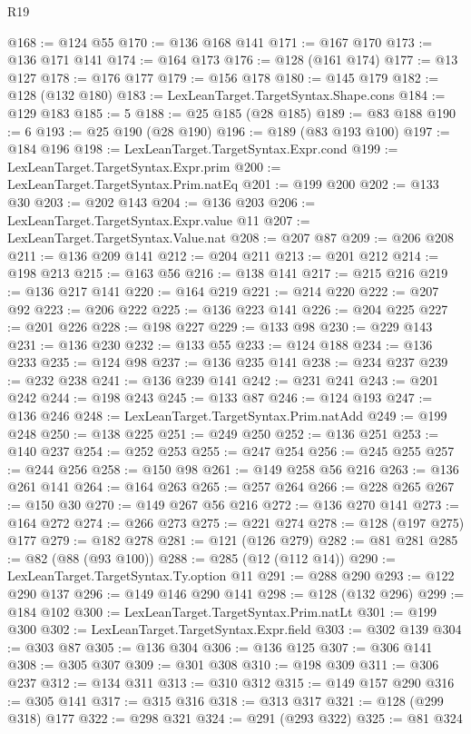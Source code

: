 \begin{lexlean}{R19}
\begin{coremodule}
@168 := @124 @55
@170 := @136 @168 @141
@171 := @167 @170
@173 := @136 @171 @141
@174 := @164 @173
@176 := @128 (@161 @174)
@177 := @13 @127
@178 := @176 @177
@179 := @156 @178
@180 := @145 @179
@182 := @128 (@132 @180)
@183 := LexLeanTarget.TargetSyntax.Shape.cons
@184 := @129 @183
@185 := 5
@188 := @25 @185 (@28 @185)
@189 := @83 @188
@190 := 6
@193 := @25 @190 (@28 @190)
@196 := @189 (@83 @193 @100)
@197 := @184 @196
@198 := LexLeanTarget.TargetSyntax.Expr.cond
@199 := LexLeanTarget.TargetSyntax.Expr.prim
@200 := LexLeanTarget.TargetSyntax.Prim.natEq
@201 := @199 @200
@202 := @133 @30
@203 := @202 @143
@204 := @136 @203
@206 := LexLeanTarget.TargetSyntax.Expr.value @11
@207 := LexLeanTarget.TargetSyntax.Value.nat
@208 := @207 @87
@209 := @206 @208
@211 := @136 @209 @141
@212 := @204 @211
@213 := @201 @212
@214 := @198 @213
@215 := @163 @56
@216 := @138 @141
@217 := @215 @216
@219 := @136 @217 @141
@220 := @164 @219
@221 := @214 @220
@222 := @207 @92
@223 := @206 @222
@225 := @136 @223 @141
@226 := @204 @225
@227 := @201 @226
@228 := @198 @227
@229 := @133 @98
@230 := @229 @143
@231 := @136 @230
@232 := @133 @55
@233 := @124 @188
@234 := @136 @233
@235 := @124 @98
@237 := @136 @235 @141
@238 := @234 @237
@239 := @232 @238
@241 := @136 @239 @141
@242 := @231 @241
@243 := @201 @242
@244 := @198 @243
@245 := @133 @87
@246 := @124 @193
@247 := @136 @246
@248 := LexLeanTarget.TargetSyntax.Prim.natAdd
@249 := @199 @248
@250 := @138 @225
@251 := @249 @250
@252 := @136 @251
@253 := @140 @237
@254 := @252 @253
@255 := @247 @254
@256 := @245 @255
@257 := @244 @256
@258 := @150 @98
@261 := @149 @258 @56 @216
@263 := @136 @261 @141
@264 := @164 @263
@265 := @257 @264
@266 := @228 @265
@267 := @150 @30
@270 := @149 @267 @56 @216
@272 := @136 @270 @141
@273 := @164 @272
@274 := @266 @273
@275 := @221 @274
@278 := @128 (@197 @275) @177
@279 := @182 @278
@281 := @121 (@126 @279)
@282 := @81 @281
@285 := @82 (@88 (@93 @100))
@288 := @285 (@12 (@112 @14))
@290 := LexLeanTarget.TargetSyntax.Ty.option @11
@291 := @288 @290
@293 := @122 @290 @137
@296 := @149 @146 @290 @141
@298 := @128 (@132 @296)
@299 := @184 @102
@300 := LexLeanTarget.TargetSyntax.Prim.natLt
@301 := @199 @300
@302 := LexLeanTarget.TargetSyntax.Expr.field
@303 := @302 @139
@304 := @303 @87
@305 := @136 @304
@306 := @136 @125
@307 := @306 @141
@308 := @305 @307
@309 := @301 @308
@310 := @198 @309
@311 := @306 @237
@312 := @134 @311
@313 := @310 @312
@315 := @149 @157 @290
@316 := @305 @141
@317 := @315 @316
@318 := @313 @317
@321 := @128 (@299 @318) @177
@322 := @298 @321
@324 := @291 (@293 @322)
@325 := @81 @324

\end{coremodule}
\end{lexlean}
